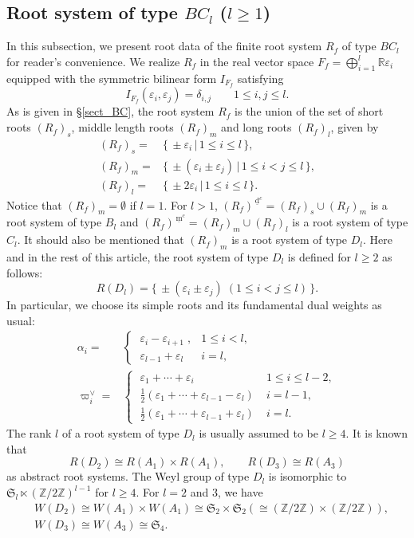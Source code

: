 \documentclass[11pt]{amsart}
\newcommand{\R}{\mathbb{R}}
\newcommand{\Z}{\mathbb{Z}}
\newcommand{\fS}{\mathfrak{S}}
\newcommand{\dc}{\,\underline{\mathrm{d}}^c}
\newcommand{\mc}{\, \underline{\mathrm{m}}^c}
\newcommand{\vep}{\varepsilon}
\begin{document}
\subsection{Root system of type $BC_l$ ($l\geq 1$)}\label{sect_BC-l}
In this subsection, we present root data of the finite root system $R_f$ of type $BC_l$
for reader's convenience. We realize $R_f$ in the real vector space $F_f=\bigoplus_{i=1}^l \R \vep_i$ equipped with the symmetric bilinear form $I_{F_f}$ satisfying
\begin{equation}\label{normalization-I} 
I_{F_f}(\vep_i, \vep_j)=\delta_{i,j} \qquad 1\leq i,j \leq l. 
\end{equation}
As is given in \S \ref{sect_BC}, the root system $R_f$ is the union of the set of short roots $(R_f)_s$, middle length roots $(R_f)_m$ and long roots $(R_f)_l$, given by
\begin{align*}
(R_f)_s=
&\{ \, \pm \vep_i\, \vert\, 1\leq i\leq l\, \}, \\
(R_f)_m=
&\{ \, \pm(\vep_i \pm \vep_j)\, \vert\, 1\leq i<j\leq l\, \}, \\
(R_f)_l=
&\{\, \pm 2\vep_i\, \vert\, 1\leq i\leq l\, \}.
\end{align*}
Notice that $(R_f)_m=\emptyset$ if $l=1$. 
For $l>1$, $(R_f)^{\dc}=(R_f)_s \cup (R_f)_m$ is a root system of type $B_l$ and $(R_f)^{\mc}=(R_f)_m \cup (R_f)_l$ is a root system of type $C_l$. It should also be mentioned that $(R_f)_m$ is a root system of type $D_l$. Here and in the rest of this article, the root system of type $D_l$ is defined for $l\geq 2$ as follows:
\[ R(D_l)=\{\,\pm (\vep_i \pm \vep_j)\; (1\leq i<j\leq l)\, \}. \]
In particular, we choose its simple roots and its fundamental dual weights as usual:
\begin{align*}
 \alpha_i= 
 &\begin{cases} \; \vep_i-\vep_{i+1}\;, & 1\leq i<l, \\ 
                                         \; \vep_{l-1}+\vep_l\; & i=l, \end{cases} \\
 \varpi_i^\vee=
 &\begin{cases} \; \vep_1+\cdots +\vep_i\; &1\leq i\leq l-2, \\
                                               \;  \frac{1}{2}(\vep_1+\cdots +\vep_{l-1}-\vep_l)\; &i=l-1,  \\
                                               \; \frac{1}{2}(\vep_1+\cdots +\vep_{l-1}+\vep_l)\; &i=l. \end{cases}
\end{align*}
 The rank $l$ of a root system of type $D_l$ is usually assumed to be $l\geq 4$. 
It is known that 
\[ R(D_2) \cong R(A_1) \times R(A_1), \qquad
R(D_3) \cong R(A_3) \]
as abstract root systems. The Weyl group of type $D_l$ is isomorphic to $\fS_l \ltimes (\Z/2\Z)^{l-1}$ for $l \geq 4$. For $l=2$ and $3$, we have
\begin{align*}
& W(D_2) \cong W(A_1) \times W(A_1) \cong 
\fS_2 \times \fS_2 \left( \cong (\Z/2\Z) \times (\Z/2\Z) \right), \\
&  W(D_3) \cong W(A_3)\cong \fS_4. 
\end{align*}
\end{document}
